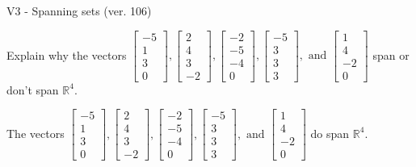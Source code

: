 \begin{exercise}
  \begin{exerciseTitle}V3 - Spanning sets (ver. 106)\end{exerciseTitle}
  \begin{exerciseStatement}
    Explain why the vectors \(\left[\begin{array}{r}
-5 \\
1 \\
3 \\
0
\end{array}\right] , \left[\begin{array}{r}
2 \\
4 \\
3 \\
-2
\end{array}\right] , \left[\begin{array}{r}
-2 \\
-5 \\
-4 \\
0
\end{array}\right] , \left[\begin{array}{r}
-5 \\
3 \\
3 \\
3
\end{array}\right] , \text{ and } \left[\begin{array}{r}
1 \\
4 \\
-2 \\
0
\end{array}\right]\) span or don't span \(\mathbb{R}^4\). 
	


  \end{exerciseStatement}
  \begin{exerciseAnswer}
   The vectors \(\left[\begin{array}{r}
-5 \\
1 \\
3 \\
0
\end{array}\right] , \left[\begin{array}{r}
2 \\
4 \\
3 \\
-2
\end{array}\right] , \left[\begin{array}{r}
-2 \\
-5 \\
-4 \\
0
\end{array}\right] , \left[\begin{array}{r}
-5 \\
3 \\
3 \\
3
\end{array}\right] , \text{ and } \left[\begin{array}{r}
1 \\
4 \\
-2 \\
0
\end{array}\right]\) 
  	 do  
	span \(\mathbb{R}^4\).
  


  \end{exerciseAnswer}
\end{exercise}